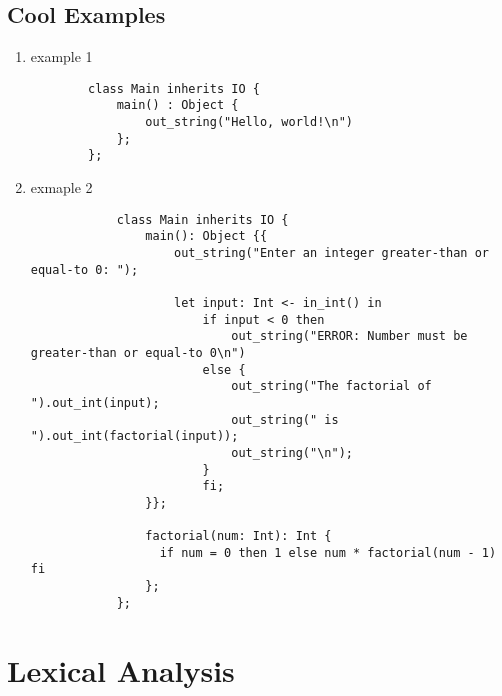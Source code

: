\documentclass[11pt]{report}
\begin{document}
    \section{Cool Examples}
    \begin{enumerate}
        \item example 1
        \begin{lstlisting}
        class Main inherits IO {
            main() : Object {
                out_string("Hello, world!\n")
            };
        };
        \end{lstlisting}
        \item  exmaple 2
        \begin{lstlisting}
            class Main inherits IO {
                main(): Object {{
                    out_string("Enter an integer greater-than or equal-to 0: ");
              
                    let input: Int <- in_int() in
                        if input < 0 then
                            out_string("ERROR: Number must be greater-than or equal-to 0\n")
                        else {
                            out_string("The factorial of ").out_int(input);
                            out_string(" is ").out_int(factorial(input));
                            out_string("\n");
                        }
                        fi;
                }};
              
                factorial(num: Int): Int {
                  if num = 0 then 1 else num * factorial(num - 1) fi
                };
            };
        \end{lstlisting}
    \end{enumerate}    

    \newpage
    \chapter{Lexical Analysis}
\end{document}
